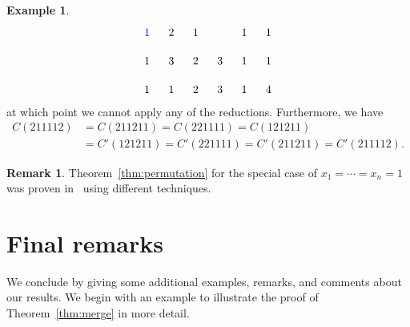 \documentclass[reqno]{amsart}
\newcommand{\0}{\phantom{c}}
\theoremstyle{plain}
\theoremstyle{definition}
\newtheorem{example}[thm]{Example}
\newtheorem{remark}[thm]{Remark}
\numberwithin{equation}{section}
\begin{document}
\begin{example}
\[\begin{tikzpicture}[scale=0.9]
  \node[blue] at (1*\sc,\lll) {$1$};
  \foreach \i in {3,5,6} { \node at (\i*\sc,\lll) {$1$}; }
  \foreach \i in {2} { \node at (\i*\sc,\lll) {$2$}; }
  \foreach \i in {1,5,6} { \node at (\i*\sc,\ll) {$1$}; }
  \foreach \i in {3} { \node at (\i*\sc,\ll) {$2$}; }
  \foreach \i in {2,4} { \node at (\i*\sc,\ll) {$3$}; }
  \foreach \i in {1,2,5} { \node at (\i*\sc,\l) {$1$}; }
  \foreach \i in {3} { \node at (\i*\sc,\l) {$2$}; }
  \foreach \i in {4} { \node at (\i*\sc,\l) {$3$}; }
  \foreach \i in {6} { \node at (\i*\sc,\l) {$4$}; }
\end{tikzpicture}
\]
at which point we cannot apply any of the reductions.
Furthermore, we have
\begin{align*}
C(211112) & = C(211211) = C(221111) = C(121211)
\\ & = C'(121211) = C'(221111) = C'(211211) = C'(211112).
\end{align*}
\end{example}

\begin{remark}
Theorem~\ref{thm:permutation} for the special case of $x_1 = \cdots = x_n = 1$ was proven in~\cite{AAMP} using different techniques.
\end{remark}










\section{Final remarks}
\label{sec:remarks}

We conclude by giving some additional examples, remarks, and comments about our results.
We begin with an example to illustrate the proof of Theorem~\ref{thm:merge} in more detail.
\end{document}
